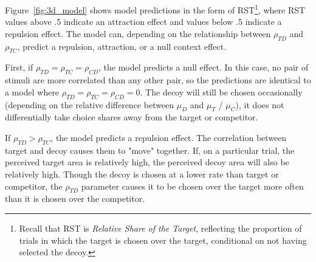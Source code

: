 Figure~\ref{fig:3d_model} shows model predictions in the form of RST\footnote{Recall that RST is \textit{Relative Share of the Target}, reflecting the proportion of trials in which the target is chosen over the target, conditional on not having selected the decoy.}, where RST values above .5 indicate an attraction effect and values below .5 indicate a repulsion effect. The model can, depending on the relationship between $\rho_{TD}$ and $\rho_{TC}$, predict a repulsion, attraction, or a null context effect. 

First, if $\rho_{TD}=\rho_{TC}=\rho_{CD}$, the model predicts a null effect. In this case, no pair of stimuli are more correlated than any other pair, so the predictions are identical to a model where $\rho_{TD}=\rho_{TC}=\rho_{CD}=0$. The decoy will still be chosen occasionally (depending on the relative difference between $\mu_{D}$ and $\mu_{T}$ / $\mu_{C}$), it does not differentially take choice shares away from the target or competitor. 

If $\rho_{TD}>\rho_{TC}$, the model predicts a repulsion effect. The correlation between target and decoy causes them to "move" together. If, on a particular trial, the perceived target area is relatively high, the perceived decoy area will also be relatively high. Though the decoy is chosen at a lower rate than target or competitor, the $\rho_{TD}$ parameter causes it to be chosen over the target more often than it is chosen over the competitor.  

